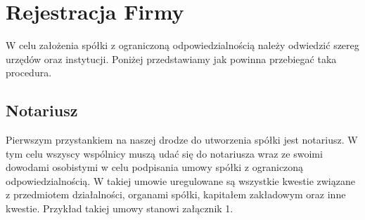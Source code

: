 \section{Rejestracja Firmy}

W celu założenia spółki z ograniczoną odpowiedzialnością należy odwiedzić szereg urzędów oraz instytucji. Poniżej przedstawiamy jak powinna przebiegać taka procedura.
\subsection{Notariusz}
Pierwszym przystankiem na naszej drodze do utworzenia spółki jest notariusz. W tym celu wszyscy wspólnicy muszą udać się do notariusza wraz ze swoimi dowodami osobistymi w celu podpisania umowy spółki z ograniczoną odpowiedzialnością. W takiej umowie uregulowane są wszystkie kwestie związane z przedmiotem działalności, organami spółki, kapitałem zakładowym oraz inne kwestie.  Przykład takiej umowy stanowi załącznik 1.
